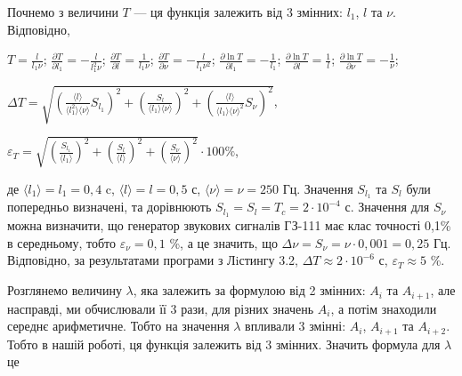\documentclass[12pt,a4paper]{article}
\begin{document}
    \vspace{1em} %

    Почнемо з величини $T$ --- ця функція залежить від 3 змінних: $l_1$, $l$ та $\nu$. Відповідно,

    \begin{center}

        $\displaystyle T = \frac{l}{l_1 \nu}$; $\displaystyle \frac{\partial T}{\partial l_1} = -\frac{l}{l_1^2 \nu}$; $\displaystyle \frac{\partial T}{\partial l} = \frac{1}{l_1 \nu}$; $\displaystyle \frac{\partial T}{\partial \nu} = -\frac{l}{l_1 \nu^2}$;
        $\displaystyle \frac{\partial \ln T}{\partial l_1} = -\frac{1}{l_1}$; $\displaystyle \frac{\partial \ln T}{\partial l} = \frac{1}{l}$; $\displaystyle \frac{\partial \ln T}{\partial \nu} = -\frac{1}{\nu}$;

    \end{center}

    \begin{center}

        $\displaystyle \Delta T = \sqrt{\left( \frac{\text{⟨}l\text{⟩}}{\text{⟨}l_1^2\text{⟩} \text{⟨}\nu\text{⟩}} S_{l_1} \right)^2 + \left( \frac{S_l}{\text{⟨}l_1\text{⟩} \text{⟨}\nu\text{⟩}} \right)^2 + \left(\frac{\text{⟨}l\text{⟩}}{\text{⟨}l_1\text{⟩} \text{⟨}\nu\text{⟩}^2} S_{\nu}  \right)^2}$,

    \end{center}

    \begin{center}

        $\displaystyle \varepsilon_T = \sqrt{\left( \frac{S_{l_1}}{\text{⟨}l_1\text{⟩}} \right)^2 + \left( \frac{S_l}{\text{⟨}l\text{⟩}} \right)^2 + \left( \frac{S_{\nu }}{\text{⟨}\nu \text{⟩}} \right)^2} \cdot 100 \%$,

    \end{center}

    де $\text{⟨}l_1\text{⟩} = l_1 = 0,4$ c, $\text{⟨}l\text{⟩} = l = 0,5$ с, $\text{⟨}\nu\text{⟩} = \nu = 250$ Гц. Значення $S_{l_1}$ та $S_l$ були попередньо визначені, та дорівнюють $S_{l_1} = S_l = T_c = 2 \cdot 10^{-4}$ с.
    Значення для $S_{\nu}$ можна визначити, що генератор звукових сигналів ГЗ-111 має клас точності 0,1\% в середньому, тобто $\varepsilon_{\nu} = 0,1$ \%, а це значить, що $\Delta \nu = S_{\nu} = \nu \cdot 0,001 = 0,25$ Гц.
    Вiдповiдно, за результатами програми з Лiстингу 3.2, $\Delta T \approx 2 \cdot 10^{-6}$ с, $\varepsilon_T \approx 5$ \%.

    Розглянемо величину $\lambda$, яка залежить за формулою від 2 змінних: $A_i$ та $A_{i+1}$, але насправді, ми обчислювали її 3 рази, для різних значень $A_i$, а потім знаходили середнє арифметичне.
    Тобто на значення $\lambda$ впливали 3 змінні: $A_i$, $A_{i+1}$ та $A_{i+2}$. Тобто в нашій роботі, ця функція залежить від 3 змінних.
    Значить формула для $\lambda$ це 
\end{document}
